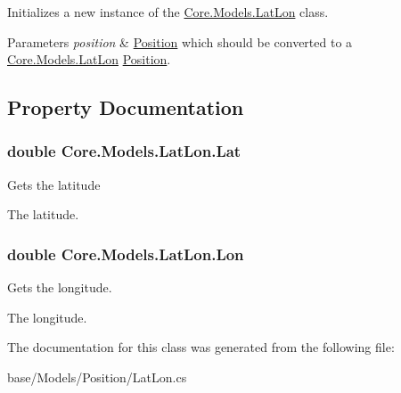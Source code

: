 Initializes a new instance of the \hyperlink{classCore_1_1Models_1_1LatLon}{Core.\+Models.\+Lat\+Lon} class. 


\begin{DoxyParams}{Parameters}
{\em position} & \hyperlink{classCore_1_1Models_1_1Position}{Position} which should be converted to a \hyperlink{classCore_1_1Models_1_1LatLon}{Core.\+Models.\+Lat\+Lon} \hyperlink{classCore_1_1Models_1_1Position}{Position}.\\
\hline
\end{DoxyParams}


\subsection{Property Documentation}
\hypertarget{classCore_1_1Models_1_1LatLon_a3b195e6b2a2f11d19ff283e921343638}{}
\subsubsection[{Lat}]{\setlength{\rightskip}{0pt plus 5cm}double Core.\+Models.\+Lat\+Lon.\+Lat\hspace{0.3cm}{\ttfamily [get]}}\label{classCore_1_1Models_1_1LatLon_a3b195e6b2a2f11d19ff283e921343638}


Gets the latitude 

The latitude.\hypertarget{classCore_1_1Models_1_1LatLon_af16c7196d72b996c3b7f593f9ea174f1}{}
\subsubsection[{Lon}]{\setlength{\rightskip}{0pt plus 5cm}double Core.\+Models.\+Lat\+Lon.\+Lon\hspace{0.3cm}{\ttfamily [get]}}\label{classCore_1_1Models_1_1LatLon_af16c7196d72b996c3b7f593f9ea174f1}


Gets the longitude. 

The longitude.

The documentation for this class was generated from the following file\+:\begin{DoxyCompactItemize}
\item 
base/\+Models/\+Position/Lat\+Lon.\+cs\end{DoxyCompactItemize}
